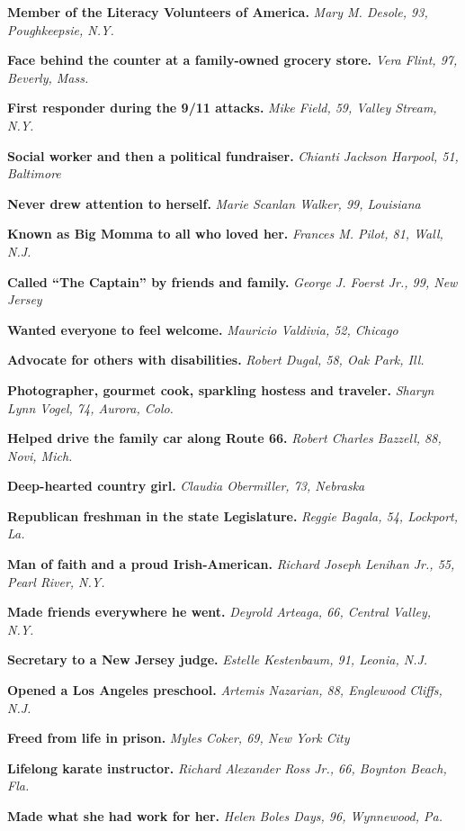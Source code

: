 \textbf{Member of the Literacy Volunteers of America.} \emph{Mary M.
Desole, 93, Poughkeepsie, N.Y.}

\textbf{Face behind the counter at a family-owned grocery store.}
\emph{Vera Flint, 97, Beverly, Mass.}

\textbf{First responder during the 9/11 attacks.} \emph{Mike Field, 59,
Valley Stream, N.Y.}

\textbf{Social worker and then a political fundraiser.} \emph{Chianti
Jackson Harpool, 51, Baltimore}

\textbf{Never drew attention to herself.} \emph{Marie Scanlan Walker,
99, Louisiana}

\textbf{Known as Big Momma to all who loved her.} \emph{Frances M.
Pilot, 81, Wall, N.J.}

\textbf{Called ``The Captain'' by friends and family.} \emph{George J.
Foerst Jr., 99, New Jersey}

\textbf{Wanted everyone to feel welcome.} \emph{Mauricio Valdivia, 52,
Chicago}

\textbf{Advocate for others with disabilities.} \emph{Robert Dugal, 58,
Oak Park, Ill.}

\textbf{Photographer, gourmet cook, sparkling hostess and traveler.}
\emph{Sharyn Lynn Vogel, 74, Aurora, Colo.}

\textbf{Helped drive the family car along Route 66.} \emph{Robert
Charles Bazzell, 88, Novi, Mich.}

\textbf{Deep-hearted country girl.} \emph{Claudia Obermiller, 73,
Nebraska}

\textbf{Republican freshman in the state Legislature.} \emph{Reggie
Bagala, 54, Lockport, La.}

\textbf{Man of faith and a proud Irish-American.} \emph{Richard Joseph
Lenihan Jr., 55, Pearl River, N.Y.}

\textbf{Made friends everywhere he went.} \emph{Deyrold Arteaga, 66,
Central Valley, N.Y.}

\textbf{Secretary to a New Jersey judge.} \emph{Estelle Kestenbaum, 91,
Leonia, N.J.}

\textbf{Opened a Los Angeles preschool.} \emph{Artemis Nazarian, 88,
Englewood Cliffs, N.J.}

\textbf{Freed from life in prison.} \emph{Myles Coker, 69, New York
City}

\textbf{Lifelong karate instructor.} \emph{Richard Alexander Ross Jr.,
66, Boynton Beach, Fla.}

\textbf{Made what she had work for her.} \emph{Helen Boles Days, 96,
Wynnewood, Pa.}

